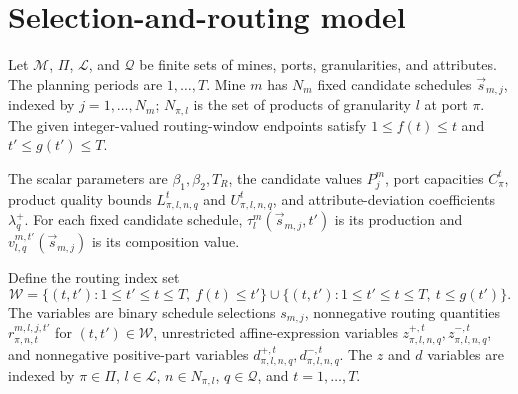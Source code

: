 \documentclass{article}
\begin{document}
\section*{Selection-and-routing model}

Let $\mathcal M$, $\Pi$, $\mathcal L$, and $\mathcal Q$ be finite sets of mines, ports, granularities, and attributes. The planning periods are $1,\ldots,T$. Mine $m$ has $N_m$ fixed candidate schedules $\vec s_{m,j}$, indexed by $j=1,\ldots,N_m$; $N_{\pi,l}$ is the set of products of granularity $l$ at port $\pi$. The given integer-valued routing-window endpoints satisfy $1\leq f(t)\leq t$ and $t'\leq g(t')\leq T$.

The scalar parameters are $\beta_1,\beta_2,T_R$, the candidate values $P_j^m$, port capacities $C_\pi^t$, product quality bounds $L_{\pi,l,n,q}^{t}$ and $U_{\pi,l,n,q}^{t}$, and attribute-deviation coefficients $\lambda_q^{+}$. For each fixed candidate schedule, $\tau_l^m(\vec s_{m,j},t')$ is its production and $v_{l,q}^{m,t'}(\vec s_{m,j})$ is its composition value.

Define the routing index set
\[
\mathcal W=\{(t,t'):1\leq t'\leq t\leq T,\ f(t)\leq t'\}
\cup\{(t,t'):1\leq t'\leq t\leq T,\ t\leq g(t')\}.
\]
The variables are binary schedule selections $s_{m,j}$, nonnegative routing quantities $r_{\pi,n,t}^{m,l,j,t'}$ for $(t,t')\in\mathcal W$, unrestricted affine-expression variables $z_{\pi,l,n,q}^{+,t},z_{\pi,l,n,q}^{-,t}$, and nonnegative positive-part variables $d_{\pi,l,n,q}^{+,t},d_{\pi,l,n,q}^{-,t}$. The $z$ and $d$ variables are indexed by $\pi\in\Pi$, $l\in\mathcal L$, $n\in N_{\pi,l}$, $q\in\mathcal Q$, and $t=1,\ldots,T$.
\end{document}
